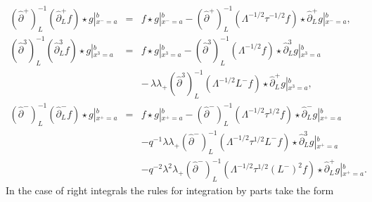 \documentclass[a4paper,11pt,oneside]{article}
\begin{document}
\begin{eqnarray}
\left( \hat{\partial}^{+}\right) _{L}^{-1}\left( \hat{\partial}%
_{L}^{+}f\right) \star g\left| _{x^{-}=a}^{b}\right. &=&f\star g\left|
_{x^{-}=a}^{b}\right. -\left( \hat{\partial}^{+}\right) _{L}^{-1}\left(
\Lambda ^{-1/2}\tau ^{-1/2}f\right) \star \hat{\partial}_{L}^{+}g\left|
_{x^{-}=a}^{b},\right. \\
\left( \hat{\partial}^{3}\right) _{L}^{-1}\left( \hat{\partial}%
_{L}^{3}f\right) \star g\left| _{x^{3}=a}^{b}\right. &=&f\star g\left|
_{x^{3}=a}^{b}\right. -\left( \hat{\partial}^{3}\right) _{L}^{-1}\left(
\Lambda ^{-1/2}f\right) \star \hat{\partial}_{L}^{3}g\left|
_{x^{3}=a}^{b}\right.  \nonumber \\
&&-\,\lambda \lambda _{+}\left( \hat{\partial}^{3}\right) _{L}^{-1}\left(
\Lambda ^{-1/2}L^{-}f\right) \star \hat{\partial}_{L}^{+}g\left|
_{x^{3}=a}^{b}\right. ,  \nonumber \\
\left( \hat{\partial}^{-}\right) _{L}^{-1}\left( \hat{\partial}%
_{L}^{-}f\right) \star g\left| _{x^{+}=a}^{b}\right. &=&f\star g\left|
_{x^{+}=a}^{b}\right. -\left( \hat{\partial}^{-}\right) _{L}^{-1}\left(
\Lambda ^{-1/2}\tau ^{1/2}f\right) \star \hat{\partial}_{L}^{-}g\left|
_{x^{+}=a}^{b}\right.  \nonumber \\
&&-q^{-1}\lambda \lambda _{+}\left( \hat{\partial}^{-}\right)
_{L}^{-1}\left( \Lambda ^{-1/2}\tau ^{1/2}L^{-}f\right) \star \hat{\partial}%
_{L}^{3}g\left| _{x^{+}=a}^{b}\right.  \nonumber \\
&&-q^{-2}\lambda ^{2}\lambda _{+}\left( \hat{\partial}^{-}\right)
_{L}^{-1}\left( \Lambda ^{-1/2}\tau ^{1/2}\left( L^{-}\right) ^{2}f\right)
\star \hat{\partial}_{L}^{+}g\left| _{x^{+}=a}^{b}\right. .  \nonumber
\end{eqnarray}
In the case of right integrals the rules for integration by parts take the
form 
\end{document}
